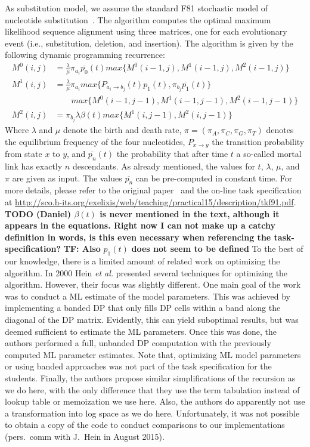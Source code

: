 \documentclass[runningheads,a4paper]{llncs}
\begin{document}
As substitution model, we assume the standard F81 stochastic model of nucleotide substitution~\cite{felsenstein1981evolutionary}. 
The algorithm computes the optimal maximum likelihood sequence alignment using three matrices, one for each evolutionary event (i.e., substitution, deletion, and insertion).
The algorithm is given by the following dynamic programming recurrence: 
\[
\begin{aligned}
  M^0(i,j)&=\frac{\lambda}{\mu}\pi_{a_i}\overline{p_0}(t)max\{M^0(i-1, j), M^1(i-1,j), M^2(i-1,j)\}\\
  M^1(i,j)&=\frac{\lambda}{\mu}\pi_{a_i}max\{P_{a_i \rightarrow b_j}(t) p_1(t), \pi_{b_j}\overline{p_1}(t)\}\\
          &\quad\quad max\{M^0(i-1, j-1), M^1(i-1,j-1), M^2(i-1,j-1)\}\\
  M^2(i,j)&=\pi_{b_j}\lambda\beta(t)max\{M^1(i,j-1), M^2(i,j-1)\}
\end{aligned}
\]
Where $\lambda$ and $\mu$ denote the birth and death rate, $\pi=(\pi_A,\pi_C,\pi_G,\pi_T)$ denotes the equilibrium frequency of the four nucleotides, 
$P_{x \rightarrow y}$ the transition probability from state $x$ to $y$, and $\overline{p_n}(t)$ the probability that after time $t$ a so-called mortal link has exactly $n$ descendants. 
As already mentioned, the values for $t$, $\lambda$, $\mu$, and $\pi$ are given as input. 
The values $\overline{p_n}$ can be pre-computed in constant time. For more details, please refer to the original paper~\cite{felsenstein1981evolutionary} and the on-line 
task specification at \url{http://sco.h-its.org/exelixis/web/teaching/practical15/description/tkf91.pdf}. {\bf TODO (Daniel) $\beta(t)$ is never mentioned in the text, although it appears in the equations. Right now I can not make up a catchy definition in words, is this even necessary when referencing the task-specification?}
\textbf{TF: Also }$p_1(t)$\textbf{ does not seem to be defined}
To the best of our knowledge, there is a limited amount of related work on optimizing the algorithm. 
In 2000 Hein {\em et al.}\cite{hein2000statistical} presented several techniques for optimizing the algorithm. However, their focus was slightly different. One main 
goal of the work was to conduct a ML estimate of the model parameters. This was achieved by implementing a banded DP that only fills DP cells
within a band along the diagonal of the DP matrix. Evidently, this can yield suboptimal results, but was deemed sufficient to estimate the ML parameters. 
Once this was done, the authors performed a full, unbanded DP computation with the previously computed ML parameter estimates. 
Note that, optimizing ML model parameters or using banded approaches was not part of the task specification for the students. 
Finally, the authors propose similar simplifications of the recursion as we do here, with the only difference that they use 
the term tabulation instead of lookup table or memoization we use here. 
Also, the authors do apparently not use a transformation into log space as we do here. Unfortunately, it was not possible to obtain 
a copy of the code to conduct comparisons to our implementations (pers.~comm with J.~Hein in August 2015).
\end{document}

